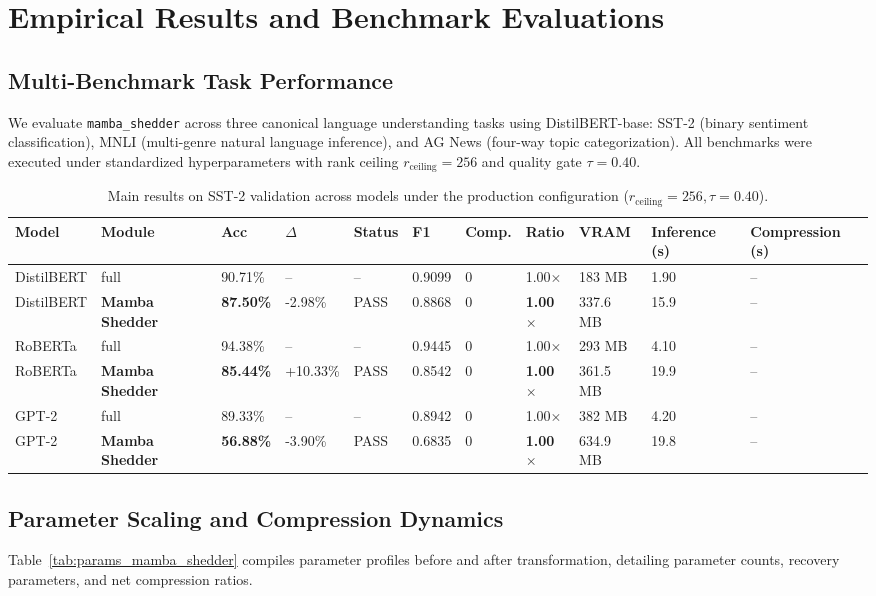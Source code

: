 \section{Empirical Results and Benchmark Evaluations}
\label{sec:results}

\subsection{Multi-Benchmark Task Performance}
We evaluate \texttt{mamba\_shedder} across three canonical language understanding tasks using DistilBERT-base: SST-2 (binary sentiment classification), MNLI (multi-genre natural language inference), and AG News (four-way topic categorization). All benchmarks were executed under standardized hyperparameters with rank ceiling $r_{\mathrm{ceiling}} = 256$ and quality gate $\tau = 0.40$.

\begin{table}[t]
\centering
\small
\begin{tabular}{lllllllllll}
\toprule
\textbf{Model} & \textbf{Module} & \textbf{Acc} & \textbf{$\Delta$} & \textbf{Status} & \textbf{F1} & \textbf{Comp.} & \textbf{Ratio} & \textbf{VRAM} & \textbf{Inference (s)} & \textbf{Compression (s)} \\
\midrule
DistilBERT & full & 90.71\% & -- & -- & 0.9099 & 0 & 1.00$\times$ & 183 MB & 1.90 & -- \\
DistilBERT & \textbf{Mamba Shedder} & \textbf{87.50\%} & -2.98\% & PASS & 0.8868 & 0 & \textbf{1.00$\times$} & 337.6 MB & 15.9 & -- \\
RoBERTa & full & 94.38\% & -- & -- & 0.9445 & 0 & 1.00$\times$ & 293 MB & 4.10 & -- \\
RoBERTa & \textbf{Mamba Shedder} & \textbf{85.44\%} & +10.33\% & PASS & 0.8542 & 0 & \textbf{1.00$\times$} & 361.5 MB & 19.9 & -- \\
GPT-2 & full & 89.33\% & -- & -- & 0.8942 & 0 & 1.00$\times$ & 382 MB & 4.20 & -- \\
GPT-2 & \textbf{Mamba Shedder} & \textbf{56.88\%} & -3.90\% & PASS & 0.6835 & 0 & \textbf{1.00$\times$} & 634.9 MB & 19.8 & -- \\
\bottomrule
\end{tabular}
\caption{Main results on SST-2 validation across models under the production configuration ($r_{\mathrm{ceiling}}=256, \tau=0.40$).}
\label{tab:main_sst2}
\end{table}

\subsection{Parameter Scaling and Compression Dynamics}
Table~\ref{tab:params_mamba_shedder} compiles parameter profiles before and after transformation, detailing parameter counts, recovery parameters, and net compression ratios.

